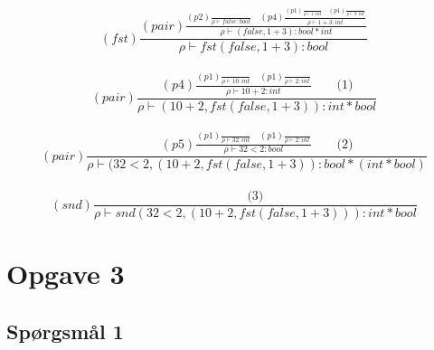 \documentclass[danish,a4paper]{report}
\begin{document}
\begin{equation}
    (fst)
    \frac{ 
        (pair)
        \frac{
            (p2)
            \frac{
            }
            {
                \rho \vdash false:bool
            } 
            \quad
            (p4)
            \frac{
                (p1)
                \frac{
                }
                {
                    \rho \vdash 1:int
                }
                \quad
                (p1)
                \frac{
                }
                {
                    \rho \vdash 3:int
                }
            }
            {
                \rho \vdash 1+3:int
            }
        }
        {
            \rho \vdash (false,1+3):bool*int
        }
    }
    {
        \rho \vdash fst(false,1+3):bool
    }
\end{equation}\\
\begin{equation}
(pair)
\frac{
    (p4)
    \frac{
        (p1)
        \frac{
        }
        {
            \rho \vdash 10:int
        }
        \quad
        (p1)
        \frac{
        }
        {
            \rho \vdash 2:int
        }
    }
    {
        \rho \vdash 10+2:int
    }
    \quad\quad
    \text{(1)}
}
{
    \rho \vdash (10+2,fst(false,1+3)):int*bool
}
\end{equation}\\
\begin{equation}
(pair)
    \frac{
        (p5)
        \frac{
            (p1)
            \frac{
            }
            {
                \rho \vdash 32:int
            }
            \quad
            (p1)
            \frac{ 
            }
            {
                \rho \vdash 2:int
            }
        }
        {
            \rho \vdash 32<2:bool
        }
        \quad\quad
        \text{(2)}
    }
    {
        \rho \vdash (32<2,(10+2,fst(false,1+3)):bool*(int*bool)
    }
\end{equation}\\
\begin{equation}
(snd)
\frac{
    \text{(3)}
}
{
    \rho \vdash snd(32<2,(10+2,fst(false,1+3))):int*bool
}
\end{equation}

\chapter*{Opgave 3}
\section*{Spørgsmål 1}
\end{document}
